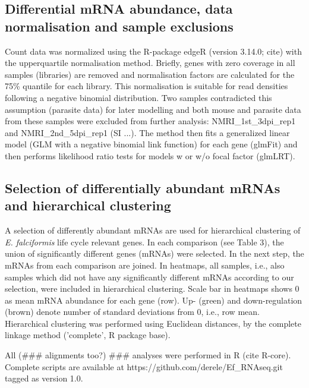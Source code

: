 \documentclass{bmcart}
\begin{document}
\subsection*{Differential mRNA abundance, data normalisation and sample exclusions}
Count data was normalized using the R-package edgeR (version 3.14.0;
cite) with the upperquartile normalisation method. Briefly, genes with
zero coverage in all samples (libraries) are removed and normalisation
factors are calculated for the 75\% quantile for each library. This
normalisation is suitable for read densities following a negative
binomial distribution. Two samples contradicted this assumption
(parasite data) for later modelling and both mouse and parasite data
from these samples were excluded from further analysis:
NMRI\_1st\_3dpi\_rep1 and NMRI\_2nd\_5dpi\_rep1 (SI ...). The method
then fits a generalized linear model (GLM with a negative binomial
link function) for each gene (glmFit) and then performs likelihood
ratio tests for models w or w/o focal factor (glmLRT).

\subsection*{Selection of differentially abundant mRNAs and hierarchical clustering}
A selection of differently abundant mRNAs are used for hierarchical
clustering of \textit{E. falciformis} life cycle relevant genes. In
each comparison (see Table 3), the union of significantly different genes (mRNAs)
were selected. In the next step, the mRNAs from each comparison are
joined. In heatmaps, all samples, i.e., also samples which did not have any
significantly different mRNAs according to our selection, were
included in hierarchical clustering. Scale bar in heatmaps shows 0 as
mean mRNA abundance for each gene (row). Up- (green) and
down-regulation (brown) denote number of standard deviations from 0,
i.e., row mean. Hierarchical clustering was performed using
Euclidean distances, by the complete linkage method ('complete', R package
base).

All (### alignments too?) ### analyses were performed in R (cite R-core). Complete scripts are
available at https://github.com/derele/Ef\_RNAseq.git tagged as version
1.0.



\end{document}

